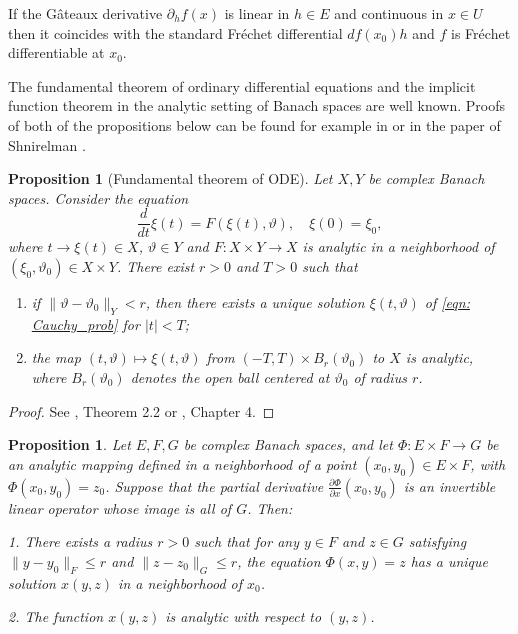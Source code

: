 \documentclass[11pt]{amsart}
\numberwithin{equation}{section}
\newtheorem{proposition}[theorem]{Proposition}
\begin{document}
If the G\^ateaux derivative $\partial_h f(x)$ is linear in $h\in E$ and continuous in $x\in U$ then it coincides with the standard Fr\'echet differential $df(x_0)h$ and $f$ is Fr\'echet differentiable at $x_0$. 
    
The fundamental theorem of ordinary differential equations and the implicit function theorem in the analytic setting of Banach spaces are well known. Proofs of both of the propositions below can be found for example in \cite{Zeidler1986} or in the paper of Shnirelman \cite{Shn12}.

\begin{proposition}[Fundamental theorem of ODE]\label{prop: analytic_Shnirelman}
	Let $X, Y$ be complex Banach spaces. Consider the equation
%	
	\begin{equation}\label{eqn: Cauchy_prob}
	\frac{d}{dt}\xi(t)=F(\xi(t),\vartheta),\quad \xi(0)=\xi_0,
	\end{equation}
%
where $t\rightarrow \xi(t) \in X$, $\vartheta\in Y$ and $F: X\times Y\rightarrow X$ is analytic in a neighborhood of $(\xi_0,\vartheta_0)\in X\times Y$. There exist $r>0$ and $T>0$ such that 
\begin{enumerate}
    \item [(i)] if $\|\vartheta-\vartheta_0\|_Y < r$, then there exists a unique solution $\xi(t,\vartheta)$ of \eqref{eqn: Cauchy_prob} for $|t|<T$; 
    \item [(ii)] the map $(t,\vartheta)\mapsto \xi(t,\vartheta)$ from $(-T,T)\times B_r (\vartheta_0)$ to $X$ is analytic, where  $B_r (\vartheta_0)$ denotes the open ball centered at $\vartheta_0$ of radius $r$.
\end{enumerate}

\end{proposition}
\begin{proof}
    See \cite{Shn12}, Theorem 2.2 or \cite{Zeidler1986}, Chapter 4.
\end{proof}

\begin{proposition}\label{prop:AIFT_Shnirelman}
  Let $E, F, G$ be complex Banach spaces, and let $\Phi: E \times F \to G$ be an analytic mapping defined in a neighborhood of a point $(x_0, y_0) \in E \times F$, with $\Phi(x_0, y_0) = z_0$. Suppose that the partial derivative $\frac{\partial \Phi}{\partial x} (x_0, y_0)$ is an invertible linear operator whose image is all of $G $. Then:  

1. There exists a radius $r > 0$ such that for any $y \in F$ and $z \in G$ satisfying $\|y - y_0\|_F \leq r$ and $\|z - z_0\|_G \leq r$, the equation $\Phi(x, y) = z$ has a unique solution $x(y, z)$ in a neighborhood of $x_0$.  

2. The function $x(y, z)$ is analytic with respect to $(y, z)$.  
\end{proposition}
	
\end{document}
